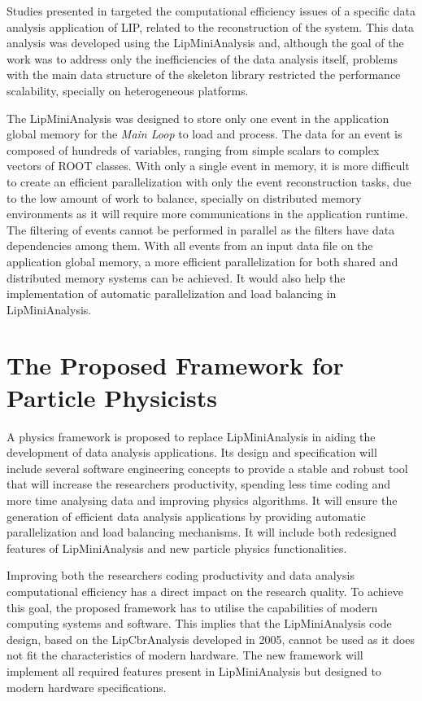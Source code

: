Studies presented in \cite{Msc:AMP,paperAMP} targeted the computational efficiency issues of a specific data analysis application of LIP, related to the reconstruction of the \ttH system. This data analysis was developed using the LipMiniAnalysis and, although the goal of the work was to address only the inefficiencies of the data analysis itself, problems with the main data structure of the skeleton library restricted the performance scalability, specially on heterogeneous platforms.

The LipMiniAnalysis was designed to store only one event in the application global memory for the \textit{Main Loop} to load and process. The data for an event is composed of hundreds of variables, ranging from simple scalars to complex vectors of ROOT classes. With only a single event in memory, it is more difficult to create an efficient parallelization with only the event reconstruction tasks, due to the low amount of work to balance, specially on distributed memory environments as it will require more communications in the application runtime. The filtering of events cannot be performed in parallel as the filters have data dependencies among them. With all events from an input data file on the application global memory, a more efficient parallelization for both shared and distributed memory systems can be achieved. It would also help the implementation of automatic parallelization and load balancing in LipMiniAnalysis.

\section{The Proposed Framework for Particle Physicists}
\label{new_framework}

A physics framework is proposed to replace LipMiniAnalysis in aiding the development of data analysis applications. Its design and specification will include several software engineering concepts to provide a stable and robust tool that will increase the researchers productivity, spending less time coding and more time analysing data and improving physics algorithms. It will ensure the generation of efficient data analysis applications by providing automatic parallelization and load balancing mechanisms. It will include both redesigned features of LipMiniAnalysis and new particle physics functionalities.

Improving both the researchers coding productivity and data analysis computational efficiency has a direct impact on the research quality. To achieve this goal, the proposed framework has to utilise the capabilities of modern computing systems and software. This implies that the LipMiniAnalysis code design, based on the LipCbrAnalysis developed in 2005, cannot be used as it does not fit the characteristics of modern hardware. The new framework will implement all required features present in LipMiniAnalysis but designed to modern hardware specifications.

